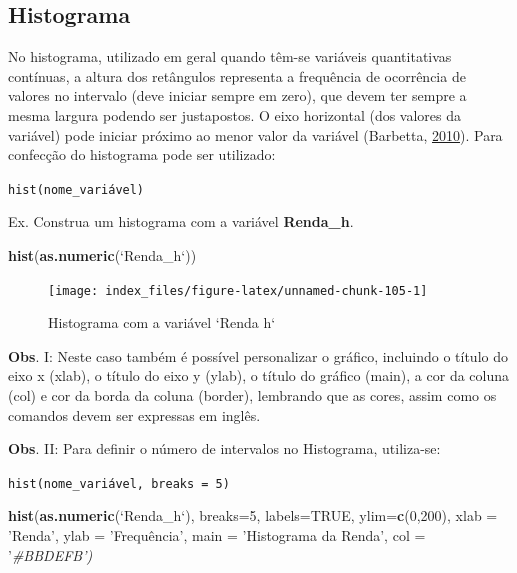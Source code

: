 \documentclass[12pt,brazil,oneside]{book}
\newenvironment{Shaded}{\begin{snugshade}}{\end{snugshade}}
\newcommand{\CommentTok}[1]{\textcolor[rgb]{0.56,0.35,0.01}{\textit{#1}}}
\newcommand{\DataTypeTok}[1]{\textcolor[rgb]{0.13,0.29,0.53}{#1}}
\newcommand{\DecValTok}[1]{\textcolor[rgb]{0.00,0.00,0.81}{#1}}
\newcommand{\KeywordTok}[1]{\textcolor[rgb]{0.13,0.29,0.53}{\textbf{#1}}}
\newcommand{\NormalTok}[1]{#1}
\newcommand{\OtherTok}[1]{\textcolor[rgb]{0.56,0.35,0.01}{#1}}
\newcommand{\StringTok}[1]{\textcolor[rgb]{0.31,0.60,0.02}{#1}}
\begin{document}
\hypertarget{histograma}{%
\subsection{Histograma}\label{histograma}}

No histograma, utilizado em geral quando têm-se variáveis quantitativas contínuas, a altura dos retângulos representa a frequência de ocorrência de valores no intervalo (deve iniciar sempre em zero), que devem ter sempre a mesma largura podendo ser justapostos. O eixo horizontal (dos valores da variável) pode iniciar próximo ao menor valor da variável (Barbetta, \protect\hyperlink{ref-barbetta1988}{2010}). Para confecção do histograma pode ser utilizado:

\texttt{hist(nome\_variável)}

Ex. Construa um histograma com a variável \textbf{Renda\_h}.

\begin{Shaded}
\begin{Highlighting}[]
\KeywordTok{hist}\NormalTok{(}\KeywordTok{as.numeric}\NormalTok{(}\StringTok{`}\DataTypeTok{Renda_h}\StringTok{`}\NormalTok{))}
\end{Highlighting}
\end{Shaded}

\begin{figure}[H]

{\centering \texttt{[image: index\_files/figure-latex/unnamed-chunk-105-1]} 

}

\caption{Histograma com a variável `Renda h`}\label{fig:unnamed-chunk-105}
\end{figure}

\textbf{Obs}. I: Neste caso também é possível personalizar o gráfico, incluindo o título do eixo x (xlab), o título do eixo y (ylab), o título do gráfico (main), a cor da coluna (col) e cor da borda da coluna (border), lembrando que as cores, assim como os comandos devem ser expressas em inglês.

\textbf{Obs}. II: Para definir o número de intervalos no Histograma, utiliza-se:

\texttt{hist(nome\_variável,\ breaks\ =\ 5)}

\begin{Shaded}
\begin{Highlighting}[]
\KeywordTok{hist}\NormalTok{(}\KeywordTok{as.numeric}\NormalTok{(}\StringTok{`}\DataTypeTok{Renda_h}\StringTok{`}\NormalTok{), }
     \DataTypeTok{breaks=}\DecValTok{5}\NormalTok{, }
     \DataTypeTok{labels=}\OtherTok{TRUE}\NormalTok{, }
     \DataTypeTok{ylim=}\KeywordTok{c}\NormalTok{(}\DecValTok{0}\NormalTok{,}\DecValTok{200}\NormalTok{), }
     \DataTypeTok{xlab =} \StringTok{'Renda'}\NormalTok{,}
     \DataTypeTok{ylab =} \StringTok{'Frequência',}
\StringTok{     main = '}\NormalTok{Histograma da Renda}\StringTok{',}
\StringTok{     col = '}\CommentTok{#BBDEFB')}
\end{Highlighting}
\end{Shaded}
\end{document}
